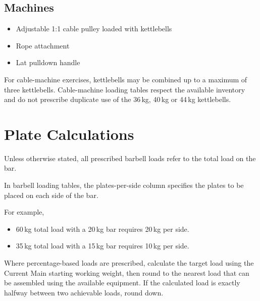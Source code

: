 \documentclass[11pt,a4paper]{article}
\begin{document}
\subsection{Machines}

\begin{itemize}
\item Adjustable 1:1 cable pulley loaded with kettlebells
\item Rope attachment
\item Lat pulldown handle
\end{itemize}

For cable-machine exercises, kettlebells may be combined up to a maximum of three kettlebells. Cable-machine loading tables respect the available inventory and do not prescribe duplicate use of the 36\,kg, 40\,kg or 44\,kg kettlebells.

\section{Plate Calculations}

Unless otherwise stated, all prescribed barbell loads refer to the total load on the bar.

In barbell loading tables, the plates-per-side column specifies the plates to be placed on each side of the bar.

For example,

\begin{itemize}
\item 60\,kg total load with a 20\,kg bar requires 20\,kg per side.
\item 35\,kg total load with a 15\,kg bar requires 10\,kg per side.
\end{itemize}

Where percentage-based loads are prescribed, calculate the target load using the Current Main starting working weight, then round to the nearest load that can be assembled using the available equipment. If the calculated load is exactly halfway between two achievable loads, round down.
\end{document}
